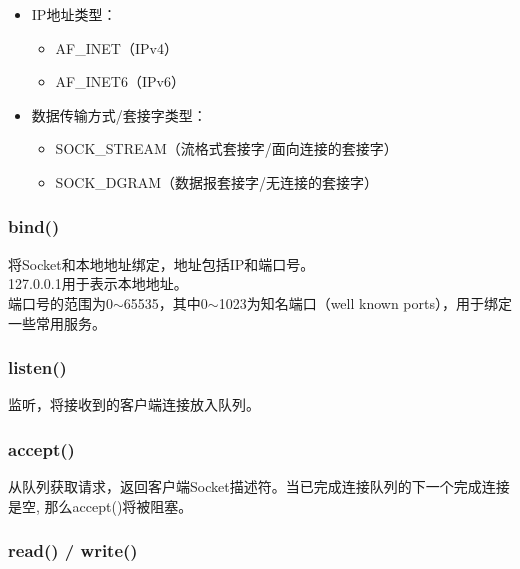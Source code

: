 \begin{itemize}
    \item IP地址类型：
          \begin{itemize}
              \item AF\_INET（IPv4）
              \item AF\_INET6（IPv6）
          \end{itemize}

    \item 数据传输方式/套接字类型：
          \begin{itemize}
              \item SOCK\_STREAM（流格式套接字/面向连接的套接字）
              \item SOCK\_DGRAM（数据报套接字/无连接的套接字）
          \end{itemize}
\end{itemize}

\vspace{0.5cm}

\subsubsection{bind()}

将Socket和本地地址绑定，地址包括IP和端口号。\\

127.0.0.1用于表示本地地址。\\

端口号的范围为0$ \sim $65535，其中0$ \sim $1023为知名端口（well known ports），用于绑定一些常用服务。\\

\subsubsection{listen()}

监听，将接收到的客户端连接放入队列。\\

\subsubsection{accept()}

从队列获取请求，返回客户端Socket描述符。当已完成连接队列的下一个完成连接是空, 那么accept()将被阻塞。\\

\subsubsection{read() / write()}

